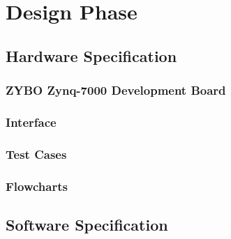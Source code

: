 
\section{Design Phase}

\subsection{Hardware Specification}

\subsubsection{ZYBO Zynq-7000 Development Board}



\subsubsection{Interface}



\subsubsection{Test Cases}



\subsubsection{Flowcharts}




\subsection{Software Specification}


